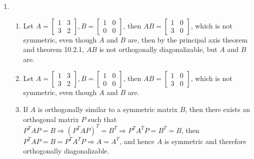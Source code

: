 \documentclass[10pt,english]{article}
\begin{document}
\begin{enumerate}
\pagebreak
\item \begin{enumerate}
    \item Let $A=\begin{bmatrix}1&3\\3&2\end{bmatrix},B=\begin{bmatrix}1&0\\0&0\end{bmatrix}$, then $AB=\begin{bmatrix}1&0\\3&0\end{bmatrix}$, which is not symmetric, even though $A$ and $B$ are, then by the principal axis theorem and theorem 10.2.1, $AB$ is not orthogonally diagonalizable, but $A$ and $B$ are. 
    \item Let $A=\begin{bmatrix}1&3\\3&2\end{bmatrix},B=\begin{bmatrix}1&0\\0&0\end{bmatrix}$, then $AB=\begin{bmatrix}1&0\\3&0\end{bmatrix}$, which is not symmetric, even though $A$ and $B$ are. 
    \item If $A$ is orthogonally similar to a symmetric matrix $B$, then there exists an orthogonal matrix $P$ such that $P^TAP=B\Rightarrow (P^TAP)^T=B^T\Rightarrow P^TA^TP=B^T=B$, then $P^TAP=B=P^TA^TP\Rightarrow A=A^T$, and hence $A$ is symmetric and therefore orthogonally diagonalizable.
\end{enumerate}
\end{enumerate}
\end{document}
